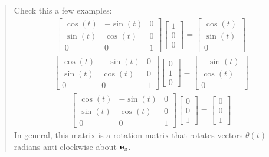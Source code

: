 \documentclass[
  letterpaper,
  DIV=11,
  numbers=noendperiod]{scrreprt}
\begin{document}
\begin{tcolorbox}
\begin{quote}
Check this a few examples: \begin{align*}
    \begin{bmatrix}
        \cos(t) & -\sin(t) & 0\\
        \sin(t) & \cos(t) & 0\\
        0 & 0 & 1
    \end{bmatrix}
    \begin{bmatrix}
        1\\
        0\\
        0
    \end{bmatrix}
    =
    \begin{bmatrix}
        \cos(t)\\
        \sin(t)\\
        0
    \end{bmatrix}
\end{align*} \begin{align*}
    \begin{bmatrix}
        \cos(t) & -\sin(t) & 0\\
        \sin(t) & \cos(t) & 0\\
        0 & 0 & 1
    \end{bmatrix}
    \begin{bmatrix}
        0\\
        1\\
        0
    \end{bmatrix}
    =
    \begin{bmatrix}
        -\sin(t)\\
        \cos(t)\\
        0
    \end{bmatrix}
\end{align*} \begin{align*}
    \begin{bmatrix}
        \cos(t) & -\sin(t) & 0\\
        \sin(t) & \cos(t) & 0\\
        0 & 0 & 1
    \end{bmatrix}
    \begin{bmatrix}
        0\\
        0\\
        1
    \end{bmatrix}
    =
    \begin{bmatrix}
        0\\
        0\\
        1
    \end{bmatrix}
\end{align*} In general, this matrix is a rotation matrix that rotates
vectors \(\theta(t)\) radians anti-clockwise about \({\bf e}_z\).
\end{quote}

\end{tcolorbox}
\end{document}
